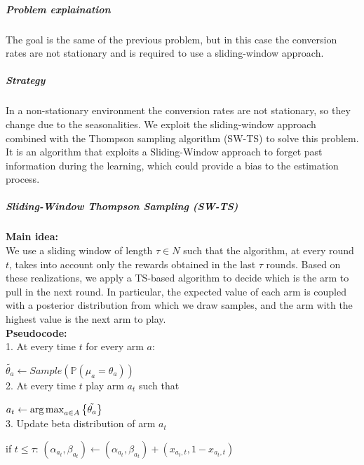 \subparagraph*{Problem explaination}
The goal is the same of the previous problem, but in this case the conversion rates are not stationary and is required to use a sliding-window approach.
\subparagraph*{Strategy}
In a non-stationary environment the conversion rates are not stationary, so they change due to the seasonalities.
We exploit the sliding-window approach combined with the Thompson sampling algorithm (SW-TS) to solve this problem. It is an algorithm that exploits a Sliding-Window approach to forget past information  during the learning, which could provide a bias to the estimation process.
\subparagraph*{Sliding-Window Thompson Sampling (SW-TS)} 

\textbf{Main idea:}\\
We use a sliding window of length $\tau\in N$ such that the algorithm, at every round $t$, takes into account only the rewards obtained in the last $\tau$ rounds. Based on these realizations, we apply a TS-based algorithm to decide which is the arm to pull in the next round. In particular, the expected value of each arm is coupled with a posterior distribution from which we draw samples, and the arm with the highest value is the next arm to play.\\

\textbf{Pseudocode:}\\

1. At every time $t$ for every arm $a$:

$\tilde{\theta_{a}} \leftarrow Sample(\mathbb P(\mu_{a}=\theta_{a}))$ \\

2. At every time $t$ play arm $a_{t}$ such that 

$a_{t} \leftarrow \operatorname{arg\,max}_{a \in A} \left\{ \tilde{\theta_{a}}  \right\} $ \\

3.  Update beta distribution of arm $a_{t}$

if $t\leq\tau$: $(\alpha_{a_{t}}, \beta_{a_{t}}) \leftarrow (\alpha_{a_{t}}, \beta_{a_{t}}) + (x_{a_{t},t}, 1 - x_{a_{t},t})$ 

